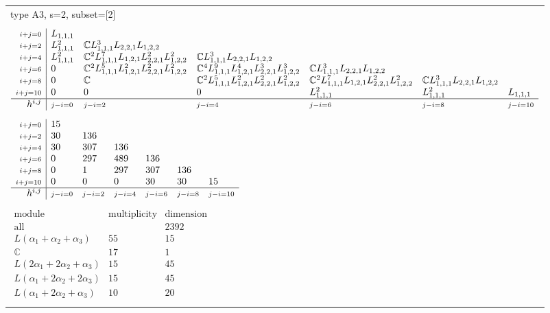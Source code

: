 \documentclass[crop,border=2mm]{standalone}
\begin{document}
\begin{tabular}{l}
{\huge type A3, s=2, subset=[2]}\\ \\


$\displaystyle
\begin{array}{r|l l l l l l}
	{\scriptstyle i+j=0}&L_{1,1,1}&&&&&\\
	{\scriptstyle i+j=2}&L_{1,1,1}^{2}&\mathbb{C}L_{1,1,1}^{3}L_{2,2,1}L_{1,2,2}&&&&\\
	{\scriptstyle i+j=4}&L_{1,1,1}^{2}&\mathbb{C}^{2}L_{1,1,1}^{7}L_{1,2,1}L_{2,2,1}^{2}L_{1,2,2}^{2}&\mathbb{C}L_{1,1,1}^{3}L_{2,2,1}L_{1,2,2}&&&\\
	{\scriptstyle i+j=6}&0&\mathbb{C}^{2}L_{1,1,1}^{5}L_{1,2,1}^{2}L_{2,2,1}^{2}L_{1,2,2}^{2}&\mathbb{C}^{4}L_{1,1,1}^{9}L_{1,2,1}^{4}L_{2,2,1}^{3}L_{1,2,2}^{3}&\mathbb{C}L_{1,1,1}^{3}L_{2,2,1}L_{1,2,2}&&\\
	{\scriptstyle i+j=8}&0&\mathbb{C}&\mathbb{C}^{2}L_{1,1,1}^{5}L_{1,2,1}^{2}L_{2,2,1}^{2}L_{1,2,2}^{2}&\mathbb{C}^{2}L_{1,1,1}^{7}L_{1,2,1}L_{2,2,1}^{2}L_{1,2,2}^{2}&\mathbb{C}L_{1,1,1}^{3}L_{2,2,1}L_{1,2,2}&\\
	{\scriptstyle i+j=10}&0&0&0&L_{1,1,1}^{2}&L_{1,1,1}^{2}&L_{1,1,1}\\
	\hline h^{i,j}&{\scriptstyle j-i=0}&{\scriptstyle j-i=2}&{\scriptstyle j-i=4}&{\scriptstyle j-i=6}&{\scriptstyle j-i=8}&{\scriptstyle j-i=10}
\end{array}
$ \\ \\


$\displaystyle
\begin{array}{r|l l l l l l}
	{\scriptstyle i+j=0}&15&&&&&\\
	{\scriptstyle i+j=2}&30&136&&&&\\
	{\scriptstyle i+j=4}&30&307&136&&&\\
	{\scriptstyle i+j=6}&0&297&489&136&&\\
	{\scriptstyle i+j=8}&0&1&297&307&136&\\
	{\scriptstyle i+j=10}&0&0&0&30&30&15\\
	\hline h^{i,j}&{\scriptstyle j-i=0}&{\scriptstyle j-i=2}&{\scriptstyle j-i=4}&{\scriptstyle j-i=6}&{\scriptstyle j-i=8}&{\scriptstyle j-i=10}
\end{array}
$ \\ \\


$\displaystyle
\begin{array}{rll}
	\text{module}&\text{multiplicity}&\text{dimension} \\ \hline \text{all}&&2392 \\
	L\left(\alpha_{1}+\alpha_{2}+\alpha_{3}\right)&55&15\\
	\mathbb{C}&17&1\\
	L\left( 2\alpha_{1}+ 2\alpha_{2}+\alpha_{3}\right)&15&45\\
	L\left(\alpha_{1}+ 2\alpha_{2}+ 2\alpha_{3}\right)&15&45\\
	L\left(\alpha_{1}+ 2\alpha_{2}+\alpha_{3}\right)&10&20
\end{array}
$ \\ \\

\end{tabular}
\end{document}
